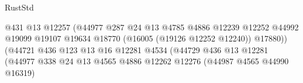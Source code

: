 \begin{lexlean}{RustStd}
\begin{coremodule}
                                                            @431
                                                            @13
                                                            @12257
                                                            (@44977
                                                              @287
                                                              @24
                                                              @13
                                                              @4785
                                                              @4886
                                                              @12239
                                                              @12252
                                                              @44992
                                                              @19099
                                                              @19107
                                                              @19634
                                                              @18770
                                                              (@16005 (@19126 @12252 @12240))
                                                              @17880))
                                                          (@44721
                                                            @436
                                                            @123
                                                            @13
                                                            @16
                                                            @12281
                                                            @4534
                                                            (@44729
                                                              @436
                                                              @13
                                                              @12281
                                                              (@44977
                                                                @338
                                                                @24
                                                                @13
                                                                @4565
                                                                @4886
                                                                @12262
                                                                @12276
                                                                (@44987 @4565 @44990 @16319)

\end{coremodule}
\end{lexlean}
